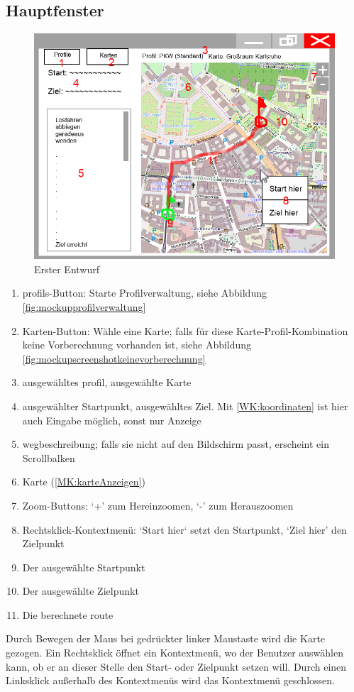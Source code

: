 \documentclass[a4paper, 11pt]{article}
\begin{document}
\subsection{Hauptfenster}
\begin{figure}[H]
\centering
\includegraphics[width=0.7\linewidth]{mockup_screenshot_main}
\caption{Erster Entwurf}
\label{fig:mockupscreenshotmain}
\end{figure}
\begin{enumerate}
\item \glspl{profil}-Button: Starte Profilverwaltung, siehe Abbildung \ref{fig:mockupprofilverwaltung}
\item Karten-Button: Wähle eine Karte; falls für diese Karte-Profil-Kombination keine Vorberechnung vorhanden ist, siehe Abbildung \ref{fig:mockupscreenshotkeinevorberechnung}
\item ausgewähltes \gls{profil}, ausgewählte Karte
\item ausgewählter Startpunkt, ausgewähltes Ziel. Mit \ref{WK:koordinaten} ist hier auch Eingabe möglich, sonst nur Anzeige
\item \gls{wegbeschreibung}; falls sie nicht auf den Bildschirm passt, erscheint ein Scrollbalken
\item Karte (\ref{MK:karteAnzeigen})
\item Zoom-Buttons: ‘+’ zum Hereinzoomen, ‘-’ zum Herauszoomen
\item Rechtsklick-Kontextmenü: ‘Start hier‘ setzt den Startpunkt, ‘Ziel hier’ den Zielpunkt
\item Der ausgewählte Startpunkt
\item Der ausgewählte Zielpunkt
\item Die berechnete \gls{route}
\end{enumerate}

Durch Bewegen der Maus bei gedrückter linker Maustaste wird die Karte gezogen. Ein Rechtsklick öffnet ein Kontextmenü, wo der Benutzer auswählen kann, ob er an dieser Stelle den Start- oder Zielpunkt setzen will. Durch einen Linksklick außerhalb des Kontextmenüs wird das Kontextmenü geschlossen.
\end{document}
